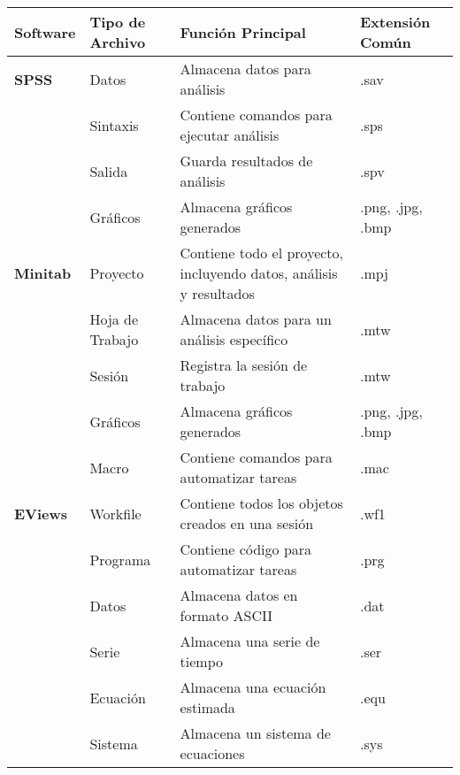 \documentclass[
  jou,
  floatsintext,
  longtable,
  a4paper,
  nolmodern,
  notxfonts,
  notimes,
  colorlinks=true,linkcolor=blue,citecolor=blue,urlcolor=blue]{apa7}
\begin{document}
\begin{longtable}[]{@{}
  >{\raggedright\arraybackslash}p{}
  >{\raggedright\arraybackslash}p{}
  >{\raggedright\arraybackslash}p{}
  >{\raggedright\arraybackslash}p{}@{}}
\toprule\noalign{}
\begin{minipage}[b]{\linewidth}\raggedright
Software
\end{minipage} & \begin{minipage}[b]{\linewidth}\raggedright
Tipo de Archivo
\end{minipage} & \begin{minipage}[b]{\linewidth}\raggedright
Función Principal
\end{minipage} & \begin{minipage}[b]{\linewidth}\raggedright
Extensión Común
\end{minipage} \\
\midrule\noalign{}
\endhead
\bottomrule\noalign{}
\endlastfoot
\textbf{SPSS} & Datos & Almacena datos para análisis & .sav \\
& Sintaxis & Contiene comandos para ejecutar análisis & .sps \\
& Salida & Guarda resultados de análisis & .spv \\
& Gráficos & Almacena gráficos generados & .png, .jpg, .bmp \\
\textbf{Minitab} & Proyecto & Contiene todo el proyecto, incluyendo
datos, análisis y resultados & .mpj \\
& Hoja de Trabajo & Almacena datos para un análisis específico & .mtw \\
& Sesión & Registra la sesión de trabajo & .mtw \\
& Gráficos & Almacena gráficos generados & .png, .jpg, .bmp \\
& Macro & Contiene comandos para automatizar tareas & .mac \\
\textbf{EViews} & Workfile & Contiene todos los objetos creados en una
sesión & .wf1 \\
& Programa & Contiene código para automatizar tareas & .prg \\
& Datos & Almacena datos en formato ASCII & .dat \\
& Serie & Almacena una serie de tiempo & .ser \\
& Ecuación & Almacena una ecuación estimada & .equ \\
& Sistema & Almacena un sistema de ecuaciones & .sys \\

\end{longtable}
\end{document}
